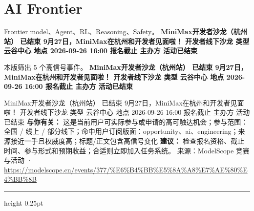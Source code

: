 \documentclass[10.5pt]{ctexart}
\begin{document}
\section*{AI Frontier}
{\color{ormuted} Frontier model、Agent、RL、Reasoning、Safety。}
\vspace{2mm}
{\LARGE\bfseries MiniMax开发者沙龙（杭州站） 已结束 9月27日，MiniMax在杭州和开发者见面啦！ 开发者线下沙龙 类型 云谷中心 地点 2026-09-26 16:00 报名截止 主办方 活动已结束}\par
\vspace{1mm}
{\color{ormuted} 本版筛出 5 个高信号事件。}
\vspace{3mm}
{\Large\bfseries MiniMax开发者沙龙（杭州站） 已结束 9月27日，MiniMax在杭州和开发者见面啦！ 开发者线下沙龙 类型 云谷中心 地点 2026-09-26 16:00 报名截止 主办方 活动已结束}\par
MiniMax开发者沙龙（杭州站） 已结束 9月27日，MiniMax在杭州和开发者见面啦！ 开发者线下沙龙 类型 云谷中心 地点 2026-09-26 16:00 报名截止 主办方 活动已结束
\textbf{与你有关：} 这是当前用户可实际参与或申请的高可触达机会；参与范围：全国 / 线上 / 部分线下；命中用户订阅版面：opportunity、ai、engineering；来源接近一手且权威度高；标题/正文包含高信号变化
\textbf{建议：} 检查报名资格、截止时间、参与形式和预期收益；合适则立即加入任务系统。
{\footnotesize\color{ormuted} 来源：ModelScope 竞赛与活动 · \url{https://modelscope.cn/events/377/%E6%B4%BB%E5%8A%A8%E7%AE%80%E4%BB%8B}}
\vspace{4mm}
\hrule height 0.25pt
\vspace{3mm}
\end{document}
